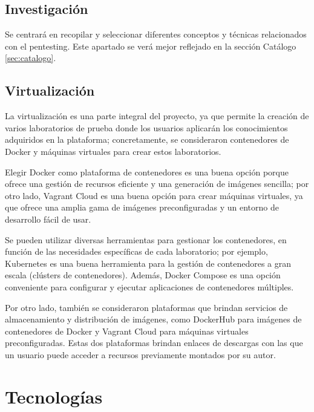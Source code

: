        \subsection{Investigación}
        
            Se centrará en recopilar y seleccionar diferentes conceptos y técnicas relacionados con el pentesting. Este apartado se verá mejor reflejado en la sección Catálogo \ref{sec:catalogo}.
        
        \subsection{Virtualización}

            La virtualización es una parte integral del proyecto, ya que permite la creación de varios laboratorios de prueba donde los usuarios aplicarán los conocimientos adquiridos en la plataforma; concretamente, se consideraron contenedores de Docker y máquinas virtuales para crear estos laboratorios.
            
            Elegir Docker como plataforma de contenedores es una buena opción porque ofrece una gestión de recursos eficiente y una generación de imágenes sencilla; por otro lado, Vagrant Cloud es una buena opción para crear máquinas virtuales, ya que ofrece una amplia gama de imágenes preconfiguradas y un entorno de desarrollo fácil de usar.
            
            Se pueden utilizar diversas herramientas para gestionar los contenedores, en función de las necesidades específicas de cada laboratorio; por ejemplo, Kubernetes es una buena herramienta para la gestión de contenedores a gran escala (clústers de contenedores). Además, Docker Compose es una opción conveniente para configurar y ejecutar aplicaciones de contenedores múltiples.
            
            Por otro lado, también se consideraron plataformas que brindan servicios de almacenamiento y distribución de imágenes, como DockerHub para imágenes de contenedores de Docker y Vagrant Cloud para máquinas virtuales preconfiguradas. Estas dos plataformas brindan enlaces de descargas con las que un usuario puede acceder a recursos previamente montados por su autor.

            \newpage

            
    \section{Tecnologías}
    
